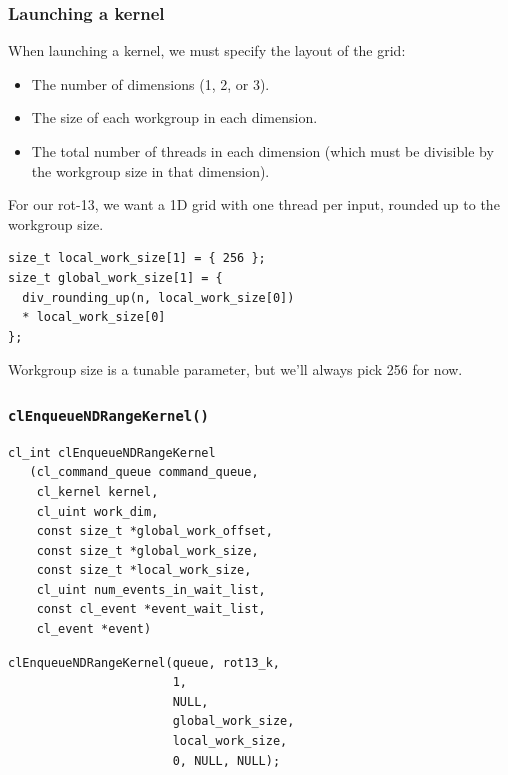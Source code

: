 \documentclass{beamer}
\begin{document}
\begin{frame}[fragile]
  \frametitle{Launching a kernel}

  When launching a kernel, we must specify the layout of the grid:

  \begin{itemize}
  \item The number of dimensions (1, 2, or 3).
  \item The size of each workgroup in each dimension.
  \item The total number of threads in each dimension (which must be
    divisible by the workgroup size in that dimension).
  \end{itemize}

  For our rot-13, we want a 1D grid with one thread per input, rounded
  up to the workgroup size.

\begin{lstlisting}
size_t local_work_size[1] = { 256 };
size_t global_work_size[1] = {
  div_rounding_up(n, local_work_size[0])
  * local_work_size[0]
};
\end{lstlisting}

Workgroup size is a tunable parameter, but we'll always pick 256 for
now.

\end{frame}

\begin{frame}
  \frametitle{\texttt{clEnqueueNDRangeKernel()}}

\begin{lstlisting}[backgroundcolor=\color{lightgray}]
 cl_int clEnqueueNDRangeKernel
   (cl_command_queue command_queue,
    cl_kernel kernel,
    cl_uint work_dim,
    const size_t *global_work_offset,
    const size_t *global_work_size,
    const size_t *local_work_size,
    cl_uint num_events_in_wait_list,
    const cl_event *event_wait_list,
    cl_event *event)
\end{lstlisting}

\begin{lstlisting}
clEnqueueNDRangeKernel(queue, rot13_k,
                       1,
                       NULL,
                       global_work_size,
                       local_work_size,
                       0, NULL, NULL);
\end{lstlisting}

\end{frame}
\end{document}
